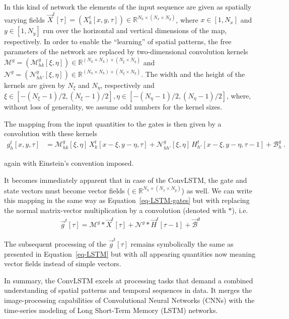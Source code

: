 \documentclass[
]{agujournal2019}
\begin{document}
In this kind of network the elements of the input sequence are given as
spatially varying fields
\(\vec{X}^t[\tau] = (X^t_k[x,y,\tau]) \in \mathbb{R}^{N_k \times (N_x \times N_y)}\),
where \(x\in[1, N_x]\) and \(y \in [1, N_y]\) run over the horizontal
and vertical dimensions of the map, respectively. In order to enable the
``learning'' of spatial patterns, the free parameters of the network are
replaced by two-dimensional convolution kernels
\(\pmb{\mathcal{M}}^{g} = (\mathcal{M}^{g}_{hk}[\xi, \eta]) \in \mathbb{R}^{(N_h \times N_k)\times (N_\xi \times N_\eta)}\)
and
\(\pmb{\mathcal{N}}^{g} = (\mathcal{N}^{g}_{hh'}[\xi, \eta]) \in \mathbb{R}^{(N_h \times N_h)\times (N_\xi \times N_\eta)}\).
The width and the height of the kernels are given by \(N_\xi\) and
\(N_\eta\), respectively and
\(\xi\in [-(N_\xi-1)/2,(N_\xi-1)/2], \eta\in [-(N_\eta-1)/2,(N_\eta-1)/2]\),
where, without loss of generality, we assume odd numbers for the kernel
sizes.

The mapping from the input quantities to the gates is then given by a
convolution with these kernels \[
\begin{aligned}
g^t_h[x,y,\tau] & =  \mathcal{M}^{g}_{hk} [\xi,\eta]\, X^t_k[x-\xi, y-\eta, \tau]  +  \mathcal{N}^{g}_{hh'}[\xi,\eta] \, H^t_{h'}[x-\xi, y-\eta, \tau-1] + \mathcal{B}^g_{h}\ .
\end{aligned}
\]

again with Einstein's convention imposed.

It becomes immediately apparent that in case of the ConvLSTM, the gate
and state vectors must become vector fields
(\(\in \mathbb{R}^{N_h \times (N_x \times N_y)}\)) as well. We can write
this mapping in the same way as Equation~\ref{eq-LSTM-gates} but with
replacing the normal matrix-vector multiplication by a convolution
(denoted with \(\ast\)), i.e.\\
\[
\begin{aligned}
\vec{g}^t[\tau] = \pmb{\mathcal{M}}^{g} \ast \vec{X}^t[\tau] + \pmb{\mathcal{N}}^{g} \ast  \vec{H}^t[ \tau-1]+ \vec{\mathcal{B}}^g \,
\end{aligned}
\]

The subsequent processing of the \(\vec{g}^t[\tau]\) remains
symbolically the same as presented in Equation~\ref{eq-LSTM} but with
all appearing quantities now meaning vector fields instead of simple
vectors.

In summary, the ConvLSTM excels at processing tasks that demand a
combined understanding of spatial patterns and temporal sequences in
data. It merges the image-processing capabilities of Convolutional
Neural Networks (CNNs) with the time-series modeling of Long Short-Term
Memory (LSTM) networks.
\end{document}
